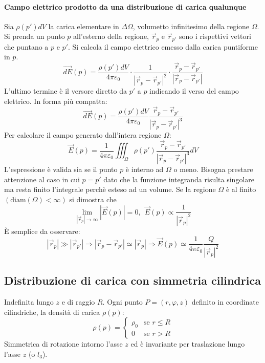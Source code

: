 \paragraph{Campo elettrico prodotto da una distribuzione di carica qualunque}
Sia $\rho(p')dV$ la carica elementare in $\Delta\Omega$, volumetto infinitesimo della regione $\Omega$.
Si prenda un punto $p$ all'esterno della regione, $\vec{r}_p$ e $\vec{r}_{p'}$ sono i rispettivi vettori
che puntano a $p$ e $p'$.
Si calcola il campo elettrico emesso dalla carica puntiforme in $p$.
$$
\vec{dE}(p) = \frac{\rho(p')dV}{4\pi\varepsilon_0}\cdot\frac{1}{|\vec{r}_p-\vec{r}_{p'}|^2} \cdot\frac{\vec{r}_p-\vec{r}_{p'}}{|\vec{r}_p-\vec{r}_{p'}|}
$$
L'ultimo termine è il versore diretto da $p'$ a $p$ indicando il verso del campo elettrico.
In forma più compatta:
$$
\vec{dE}(p) = \frac{\rho(p')dV}{4\pi \varepsilon_0} \frac{\vec{r}_p-\vec{r}_{p'}}{|\vec{r}_p-\vec{r}_{p'}|^3}
$$
Per calcolare il campo generato dall'intera regione $\Omega$:
$$
\vec{E}(p) = \frac{1}{4\pi\varepsilon_0} \iiint_\Omega \rho(p')  \frac{\vec{r}_p-\vec{r}_{p'}}{|\vec{r}_p-\vec{r}_{p'}|^3} dV
$$
L'espressione è valida sia se il punto $p$ è interno ad $\Omega$ o meno. Bisogna prestare attenzione
al caso in cui $p=p'$ dato che la funzione integranda risulta singolare ma resta finito l'integrale
perchè esteso ad un volume.
Se la regione $\Omega$ è al finito $(\text{diam}(\Omega)<\infty)$ si dimostra che 
$$
\lim_{|\vec{r}_p| \to \infty} |\vec{E}(p)| = 0,\ \ \vec{E}(p) \propto \frac{1}{|\vec{r}_p|^2}
$$
È semplice da osservare:
$$
|\vec{r}_p| \gg |\vec{r}_{p'}| \Rightarrow |\vec{r}_p -\vec{r}_{p'}| \simeq |\vec{r}_p| \Rightarrow
\vec{E}(p) \simeq \frac{1}{4 \pi \varepsilon_0}\frac{Q}{|\vec{r}_p|^2}
$$

\newpage
\subsection{Distribuzione di carica con simmetria cilindrica}
Indefinita lungo $z$ e di raggio $R$.
Ogni punto $P= (r,\varphi,z)$ definito in coordinate cilindriche, la densità di carica $\rho(p)$:
$$
\rho(p) = \begin{cases}
\rho_0 & \text{se }  r \leq R\\
0 & \text{se }  r > R
\end{cases}
$$
Simmetrica di rotazione intorno l'asse $z$ ed è invariante per traslazione lungo l'asse $z$ (o $l_3$).

